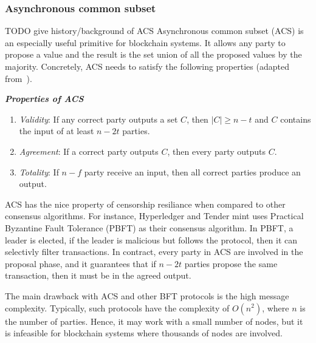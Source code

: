 \subsubsection*{Asynchronous common subset}
TODO give history/background of ACS
Asynchronous common subset (ACS) is an especially useful primitive for blockchain systems.
It allows any party to propose a value and the result is the set union of all the proposed values by the majority.
Concretely, ACS needs to satisfy the following properties (adapted from~\cite{miller2016honey}).
\begin{definition}
\label{def:acs}
\textbf{\emph{Properties of ACS}}

\begin{enumerate}
    \item \emph{Validity}:
        If any correct party outputs a set $C$,
        then $|C| \ge n - t$ and $C$ contains the input of at least $n - 2t$ parties.
    \item \emph{Agreement}:
        If a correct party outputs $C$, then every party outputs $C$.
    \item \emph{Totality}:
        If $n - f$ party receive an input, then all correct parties produce an output.
\end{enumerate}
\end{definition}

ACS has the nice property of censorship resiliance when compared to other consensus algorithms.
For instance, Hyperledger and Tender mint uses Practical Byzantine Fault Tolerance (PBFT) as their consensus algorithm.
In PBFT, a leader is elected, if the leader is malicious but follows the protocol, then it can selectivly filter transactions.
In contract, every party in ACS are involved in the proposal phase,
and it guarantees that if $n - 2t$ parties propose the same transaction, then it must be in the agreed output.

The main drawback with ACS and other BFT protocols is the high message complexity.
Typically, such protocols have the complexity of $O(n^2)$, where $n$ is the number of parties.
Hence, it may work with a small number of nodes,
but it is infeasible for blockchain systems where thousands of nodes are involved.



